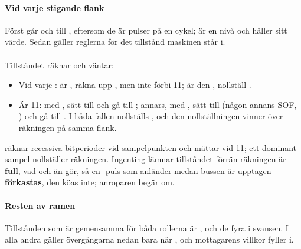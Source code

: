 \paragraph{Vid varje stigande flank}
Först går  och  till , eftersom de är pulser på en cykel;
 är en nivå och håller sitt värde. Sedan gäller reglerna för det tillstånd maskinen står
i.

\paragraph{}
Tillståndet räknar och väntar:
\begin{itemize}
  \item Vid varje : är , räkna upp , men inte
    förbi 11; är den , nollställ .
  \item Är  11: med , sätt  till  och gå till
    ; annars, med , sätt  till  (någon
    annans SOF, ) och gå till . I båda fallen nollställs
    , och den nollställningen vinner över räkningen på samma flank.
\end{itemize}

 räknar recessiva bitperioder vid sampelpunkten och mättar vid 11; ett dominant
sampel nollställer räkningen. Ingenting lämnar tillståndet förrän räkningen är \textbf{full}, vad
 och  än gör, så en -puls som anländer medan bussen är
upptagen \textbf{förkastas}, den köas inte; anroparen begär om.

\paragraph{Resten av ramen}
Tillstånden som är gemensamma för båda rollerna är ,  och de
fyra i svansen. I alla andra gäller övergångarna nedan bara när , och mottagarens
villkor fyller  i.

